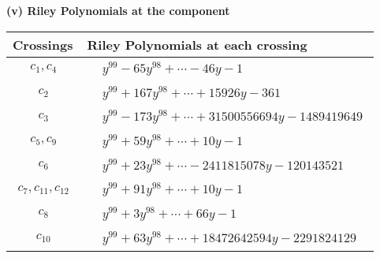 \documentclass[1p]{elsarticle_modified}
\theoremstyle{definition}
\begin{document}
\newpage\renewcommand{\arraystretch}{1}
\flushleft \textbf{(v) Riley Polynomials at the component}\newline \\
\begin{tabular}{m{50pt}|m{274pt}}
Crossings & \hspace{64pt}Riley Polynomials at each crossing \\
\hline $$\begin{aligned}c_{1},c_{4}\end{aligned}$$&$\begin{aligned}
&y^{99}-65 y^{98}+\cdots-46 y-1
\end{aligned}$\\
\hline $$\begin{aligned}c_{2}\end{aligned}$$&$\begin{aligned}
&y^{99}+167 y^{98}+\cdots+15926 y-361
\end{aligned}$\\
\hline $$\begin{aligned}c_{3}\end{aligned}$$&$\begin{aligned}
&y^{99}-173 y^{98}+\cdots+31500556694 y-1489419649
\end{aligned}$\\
\hline $$\begin{aligned}c_{5},c_{9}\end{aligned}$$&$\begin{aligned}
&y^{99}+59 y^{98}+\cdots+10 y-1
\end{aligned}$\\
\hline $$\begin{aligned}c_{6}\end{aligned}$$&$\begin{aligned}
&y^{99}+23 y^{98}+\cdots-2411815078 y-120143521
\end{aligned}$\\
\hline $$\begin{aligned}c_{7},c_{11},c_{12}\end{aligned}$$&$\begin{aligned}
&y^{99}+91 y^{98}+\cdots+10 y-1
\end{aligned}$\\
\hline $$\begin{aligned}c_{8}\end{aligned}$$&$\begin{aligned}
&y^{99}+3 y^{98}+\cdots+66 y-1
\end{aligned}$\\
\hline $$\begin{aligned}c_{10}\end{aligned}$$&$\begin{aligned}
&y^{99}+63 y^{98}+\cdots+18472642594 y-2291824129
\end{aligned}$\\
\hline
\end{tabular}\\~\\
\end{document}
